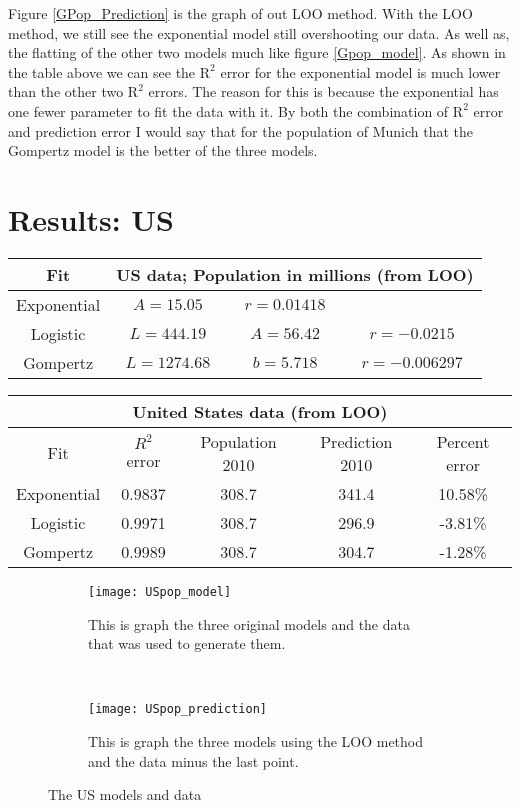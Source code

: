 \documentclass[english]{article}
\begin{document}
Figure \ref{GPop_Prediction} is the graph of out LOO method. With the LOO method, we still see the exponential model still overshooting our data. As well as, the flatting of the other two models much like figure \ref{Gpop_model}. As shown in the table above we can see the $ \text{R}^2 $ error for the exponential model is much lower than the other two $\text{R}^2 $ errors. The reason for this is because the exponential has one fewer parameter to fit the data with it. By both the combination of $\text{R}^2 $ error and prediction error I would say that for the population of Munich that the Gompertz model is the better of the three models. 

\section{Results: US}
\begin{center}
	\begin{tabular}{|c|c|c|c|}
		\hline
		Fit & \multicolumn{3}{|c|}{US data; Population in millions (from LOO)}\\
		\hline
		Exponential & $A =15.05 $ & $r=0.01418 $& \\
		\hline
		Logistic & $L =444.19 $ & $A =56.42 $ & $r =-0.0215 $\\
		\hline
		Gompertz & $L=1274.68 $& $b =5.718 $ & $r =-0.006297 $ \\    
		\hline
	\end{tabular}
	\begin{tabular}{|c|c|c|c|c|}
		\hline
		\multicolumn{5}{|c|}{United States data (from LOO)}\\
		\hline
		Fit & $R^2$ error & Population 2010 & Prediction 2010 & Percent error\\
		\hline
		Exponential & 0.9837 & 308.7 & 341.4 & 10.58\% \\
		\hline
		Logistic & 0.9971 & 308.7 & 296.9 & -3.81\%\\
		\hline
		Gompertz & 0.9989 & 308.7 & 304.7 & -1.28\% \\
		\hline
	\end{tabular}
	\begin{figure}[h]
		\begin{subfigure}{.48\textwidth}
			\centering
			\texttt{[image: USpop\_model]}
			\caption{\label{USpop_model} This is graph the three original models and the data that was used to generate them.}
		\end{subfigure}%
		~
		\begin{subfigure}{.48\textwidth}
			\centering
			\texttt{[image: USpop\_prediction]}
			\caption{\label{USpop_prediction} This is graph the three models using the LOO method and the data minus the last point.}
		\end{subfigure}
		\caption{The US models and data}
	\end{figure}
\end{center}
\end{document}
